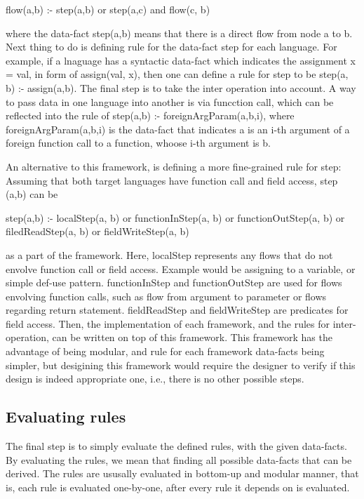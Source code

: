 flow(a,b) :- step(a,b) or step(a,c) and flow(c, b)

where the data-fact step(a,b) means that there is a direct flow from node a to b.
Next thing to do is defining rule for the data-fact step for each language.
For example, if a lnaguage has a syntactic data-fact which indicates the assignment
x = val, in form of assign(val, x), then one can define a rule for step to be
step(a, b) :- assign(a,b). The final step is to take the inter operation into account.
A way to pass data in one language into another is via funcction call, which can be
reflected into the rule of step(a,b) :- foreignArgParam(a,b,i), where foreignArgParam(a,b,i)
is the data-fact that indicates a is an i-th argument of a foreign function call to a
function, whoose i-th argument is b.

An alternative to this framework, is defining a more fine-grained rule for step:
Assuming that both target languages have function call and field access, step (a,b) can be

step(a,b) :- localStep(a, b) or functionInStep(a, b) or functionOutStep(a, b)
or filedReadStep(a, b) or fieldWriteStep(a, b)

as a part of the framework. Here, localStep represents any flows that do not
envolve function call or field access.  Example would be assigning to a
variable, or simple def-use pattern.  functionInStep and functionOutStep are
used for flows envolving function calls, such as flow from argument to
parameter or flows regarding return statement.  fieldReadStep and
fieldWriteStep are predicates for field access. Then, the implementation of
each framework, and the rules for inter-operation, can be written on top of
this framework. This framework has the advantage of being modular, and rule for
each framework data-facts being simpler, but desigining this framework would
require the designer to verify if this design is indeed appropriate one, i.e.,
there is no other possible steps.


\subsection{Evaluating rules}

The final step is to simply evaluate the defined rules, with the given data-facts.
By evaluating the rules, we mean that finding all possible data-facts that
can be derived. The rules are ususally evaluated in bottom-up and
modular manner, that is, each rule is evaluated one-by-one, after every rule
it depends on is evaluated.


